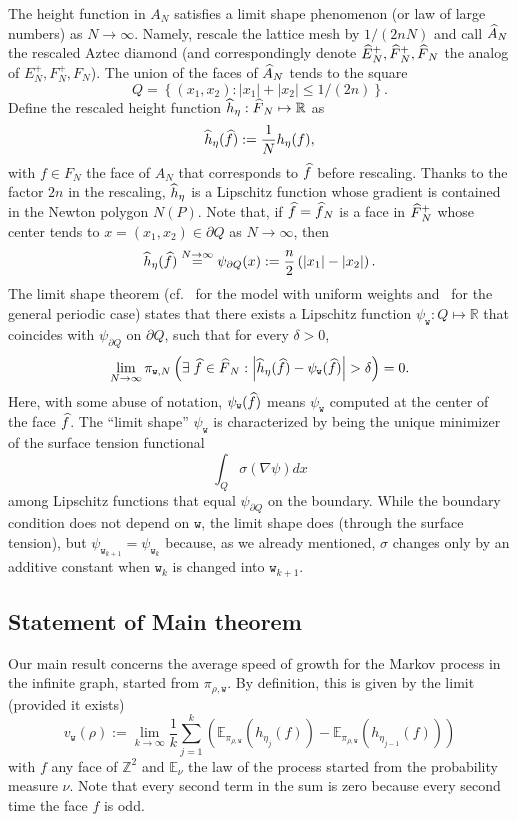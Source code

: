 \documentclass[10pt]{amsart}
\theoremstyle{definition}\newtheorem{defi}[theo]{Definition}\newtheorem{rema}[theo]{Remark}\newtheorem{exam}[theo]{Example}\newtheorem{exem}[theo]{Example}\newtheorem{nota}[theo]{Notation}
\newcommand{\ttw}{\mathtt{w}}
\newcommand{\bbE}{\mathbb{E}}
\newcommand{\bbZ}{\mathbb{Z}}
\newcommand{\bbR}{\mathbb{R}}
\let\oldhat\hat
\renewcommand*{\hat}[1]{\mathchoice{\widehat{#1}}{\widehat{#1}}{\oldhat{#1}}{\oldhat{#1}}}
\let\oldexists\exists
\renewcommand*{\exists}{\mathrel{\oldexists}}
\begin{document}
The height function in $A_N$ satisfies a limit shape phenomenon (or law of large numbers) as $N\to\infty$. Namely, rescale the lattice mesh by $1/(2nN)$ and call $\hat A_N$ the rescaled Aztec diamond (and correspondingly denote $\hat E_N^+,\hat F_N^+,\hat F_N$ the analog of $E_N^+,F_N^+,F_N$). The union of the faces of $\hat A_N$ tends to the square
\begin{equation}\label{eq:Q}
Q=\left\{(x_1,x_2):|x_1|+|x_2|\le 1/(2n)\right\}.
\end{equation}
Define the rescaled height function $\hat h_\eta:\hat F_N\mapsto \bbR$ as
\[
\hat h_\eta(\hat f):=\frac1N h_\eta(f),
\]
with $f\in F_N$ the face of $A_N$ that corresponds to $\hat f$ before rescaling. Thanks to the factor $2n$ in the rescaling, $\hat h_\eta$ is a Lipschitz function whose gradient is contained in the Newton polygon $N(P)$. Note that, if $\hat f=\hat f_N$ is a face in $\hat F^+_N$ whose center tends to $x=(x_1,x_2)\in \partial Q$ as $N\to\infty$, then
\begin{equation}\label{eq:partialQ}
\hat h_\eta(\hat f)\stackrel{N\to\infty}= \psi_{\partial Q}(x):=\frac n2\left({|x_1|-|x_2|}\right).
\end{equation}
The limit shape theorem (cf.~\cite{CKP01} for the model with uniform weights and~\cite{kuchumov2017limit} for the general periodic case) states that there exists a Lipschitz function $\psi_{\ttw}:Q\mapsto \bbR$ that coincides with $\psi_{\partial Q}$ on $\partial Q$, such that for every $\delta>0$,
\begin{equation}\label{eq:lln}
\lim_{N\to\infty} \pi_{\ttw,N}\left(\exists \hat f\in \hat F_N:\left| \hat h_\eta(\hat f)-\psi_{\ttw}(\hat f)\right|>\delta\right)=0.
\end{equation}
Here, with some abuse of notation, $\psi_{\ttw}(\hat f)$ means $\psi_{\ttw}$ computed at the center of the face $\hat f$. The ``limit shape'' $\psi_{\ttw}$ is characterized by being the unique minimizer of the surface tension functional
\[
\int_Q \sigma(\nabla \psi) dx
\]
among Lipschitz functions that equal $\psi_{\partial Q}$ on the boundary. While the boundary condition does not depend on $\ttw$, the limit shape does (through the surface tension), but $\psi_{\ttw_{k+1}}=\psi_{\ttw_{k}}$ because, as we already mentioned, $\sigma$ changes only by an additive constant when $\ttw_k$ is changed into $\ttw_{k+1}$.


\subsection{Statement of Main theorem}
Our main result concerns the average speed of growth for the Markov process in the infinite graph, started from $\pi_{\rho,\ttw}$. By definition, this is given by the limit (provided it exists)
\begin{equation}\label{eq:prov}
v_{\ttw}(\rho):= \lim_{k\to\infty}\frac1k \sum_{j=1}^k\left(\bbE_{\pi_{\rho,\ttw}}\left(h_{\eta_j}(f)\right)-\bbE_{\pi_{\rho,\ttw}}\left(h_{\eta_{j-1}}(f)\right)\right)
\end{equation}
with $f$ any face of $\bbZ^2$ and $\bbE_\nu$ the law of the process started from the probability measure $\nu$. Note that every second term in the sum is zero because every second time the face $f$ is odd.
\end{document}

